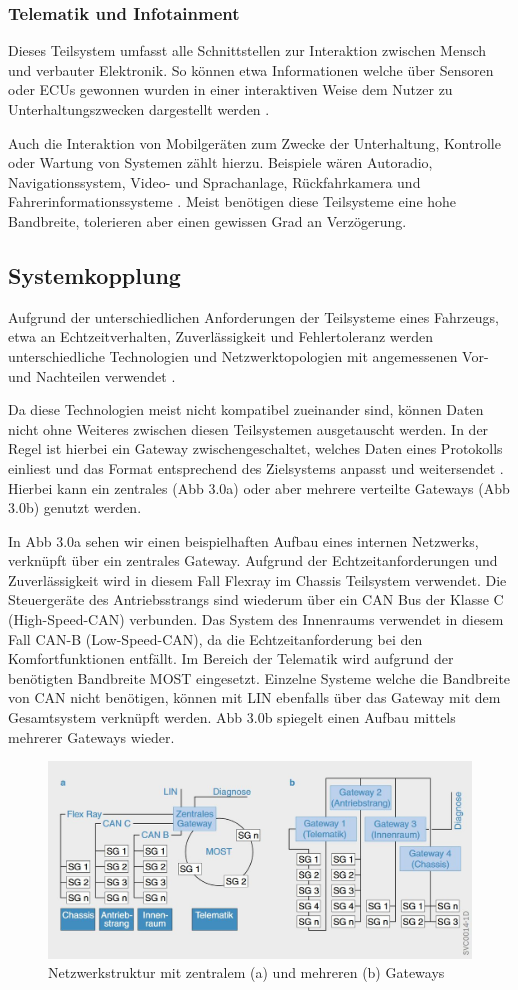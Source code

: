         \subsubsection{Telematik und Infotainment}
        Dieses Teilsystem umfasst alle Schnittstellen zur Interaktion zwischen Mensch und verbauter Elektronik. So können etwa Informationen welche über Sensoren
        oder ECUs gewonnen wurden in einer interaktiven Weise dem Nutzer zu Unterhaltungszwecken dargestellt werden \cite{TW_huang2018vehicle}.
        
        Auch die Interaktion von Mobilgeräten
        zum Zwecke der Unterhaltung, Kontrolle oder Wartung von Systemen zählt hierzu. Beispiele wären Autoradio, Navigationssystem, Video- und Sprachanlage, Rückfahrkamera und Fahrerinformationssysteme \cite{reif2011bosch}.
        Meist benötigen diese Teilsysteme eine hohe Bandbreite, tolerieren aber einen gewissen Grad an Verzögerung.
    \subsection{Systemkopplung}
    Aufgrund der unterschiedlichen Anforderungen der Teilsysteme eines Fahrzeugs, etwa an Echtzeitverhalten, Zuverlässigkeit und Fehlertoleranz werden unterschiedliche Technologien
    und Netzwerktopologien mit angemessenen Vor- und Nachteilen verwendet \cite{leen1999digital}. 
    
    Da diese Technologien meist nicht kompatibel zueinander sind, können Daten nicht ohne Weiteres zwischen diesen
    Teilsystemen ausgetauscht werden. In der Regel ist hierbei ein Gateway zwischengeschaltet, welches Daten eines Protokolls einliest und das Format entsprechend des Zielsystems anpasst
    und weitersendet \cite{reif2011bosch}\cite{TW_kim2014gateway}. Hierbei kann ein zentrales (Abb 3.0a) oder aber mehrere verteilte Gateways (Abb 3.0b) genutzt werden. 

    In Abb 3.0a sehen wir einen beispielhaften Aufbau eines internen Netzwerks, verknüpft über ein zentrales Gateway. Aufgrund der Echtzeitanforderungen und Zuverlässigkeit wird in diesem Fall Flexray
    im Chassis Teilsystem verwendet. Die Steuergeräte des Antriebsstrangs sind wiederum über ein CAN Bus der Klasse C (High-Speed-CAN) verbunden. Das System des Innenraums verwendet in diesem Fall 
    CAN-B (Low-Speed-CAN), da die Echtzeitanforderung bei den Komfortfunktionen entfällt. Im Bereich der Telematik wird aufgrund der benötigten Bandbreite MOST eingesetzt. Einzelne Systeme welche die
    Bandbreite von CAN nicht benötigen, können mit LIN ebenfalls über das Gateway mit dem Gesamtsystem verknüpft werden.
    Abb 3.0b spiegelt einen Aufbau mittels mehrerer Gateways wieder.

    \begin{figure}
    \caption{Netzwerkstruktur mit zentralem (a) und mehreren (b) Gateways \cite{reif2011bosch}}
        \includegraphics{Images/Kapitel3/TW01.JPG}
    \end{figure}
    